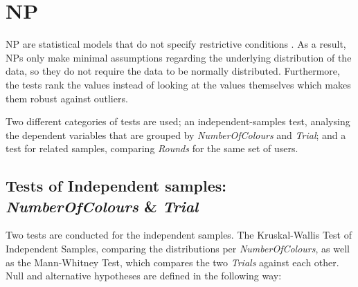 %
%
\section{\acf{NP}}
\label{ch:Evaluation:sec:Non-parametrictest}

\acl{NP} are statistical models that do not specify restrictive conditions \citep{Siegel1957}. As a result, \ac{NP}s only make minimal assumptions regarding the underlying distribution of the data, so they do not require the data to be normally distributed. Furthermore, the tests rank the values instead of looking at the values themselves which makes them robust against outliers.

Two different categories of tests are used; an independent-samples test, analysing the dependent variables that are grouped by \textit{NumberOfColours} and \textit{Trial}; and a test for related samples, comparing \textit{Rounds} for the same set of users. 

\subsection{Tests of Independent samples: \textit{NumberOfColours} \& \textit{Trial}}
Two tests are conducted for the independent samples. The Kruskal-Wallis Test of Independent Samples, comparing the distributions per \textit{NumberOfColours}, as well as the Mann-Whitney Test, which compares the two \textit{Trials} against each other.\\
Null and alternative hypotheses are defined in the following way: 

